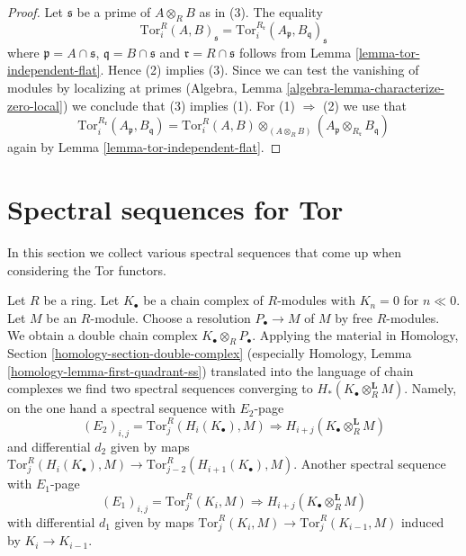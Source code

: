 \begin{proof}
Let $\mathfrak s$ be a prime of $A \otimes_R B$ as in (3).
The equality
$$
\text{Tor}_i^R(A, B)_\mathfrak s =
\text{Tor}_i^{R_\mathfrak r}(A_\mathfrak p, B_\mathfrak q)_\mathfrak s
$$
where $\mathfrak p = A \cap \mathfrak s$, $\mathfrak q = B \cap \mathfrak s$
and $\mathfrak r = R \cap \mathfrak s$ follows from
Lemma \ref{lemma-tor-independent-flat}.
Hence (2) implies (3).
Since we can test the vanishing of modules by localizing at primes
(Algebra, Lemma \ref{algebra-lemma-characterize-zero-local})
we conclude that (3) implies (1). For
(1) $\Rightarrow$ (2) we use that
$$
\text{Tor}_i^{R_\mathfrak r}(A_\mathfrak p, B_\mathfrak q) =
\text{Tor}_i^R(A, B) \otimes_{(A \otimes_R B)}
(A_\mathfrak p \otimes_{R_{\mathfrak r}} B_\mathfrak q)
$$
again by Lemma \ref{lemma-tor-independent-flat}.
\end{proof}








\section{Spectral sequences for Tor}
\label{section-spectral-sequence-tor}


\noindent
In this section we collect various spectral sequences that come up
when considering the Tor functors.

\begin{example}
\label{example-cohomology-complex-tensored}
Let $R$ be a ring. Let $K_\bullet$ be a chain complex of $R$-modules
with $K_n = 0$ for $n \ll 0$.
Let $M$ be an $R$-module. Choose a resolution $P_\bullet \to M$ of
$M$ by free $R$-modules. We obtain a double chain complex
$K_\bullet \otimes_R P_\bullet$.
Applying the material in
Homology, Section \ref{homology-section-double-complex}
(especially Homology, Lemma \ref{homology-lemma-first-quadrant-ss})
translated into the language of chain complexes
we find two spectral sequences converging to
$H_*(K_\bullet \otimes_R^\mathbf{L} M)$. Namely, on the one hand a
spectral sequence with $E_2$-page
$$
(E_2)_{i, j} = \text{Tor}^R_j(H_i(K_\bullet), M)
\Rightarrow
H_{i + j}(K_\bullet \otimes^{\mathbf{L}}_R M)
$$
and differential $d_2$ given by maps
$\text{Tor}^R_j(H_i(K_\bullet), M) \to
\text{Tor}^R_{j - 2}(H_{i + 1}(K_\bullet), M)$.
Another spectral sequence with $E_1$-page
$$
(E_1)_{i, j} = \text{Tor}^R_j(K_i, M)
\Rightarrow
H_{i + j}(K_\bullet \otimes^{\mathbf{L}}_R M)
$$
with differential $d_1$ given by maps
$\text{Tor}^R_j(K_i, M) \to \text{Tor}^R_j(K_{i - 1}, M)$
induced by $K_i \to K_{i - 1}$.
\end{example}

